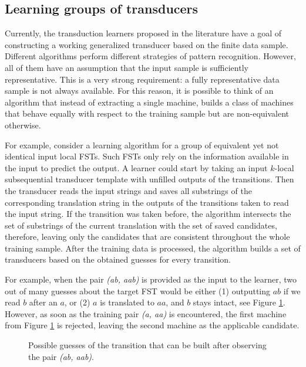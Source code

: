 \subsection{Learning groups of transducers}

Currently, the transduction learners proposed in the literature have a goal of constructing a working generalized transducer based on the finite data sample.
Different algorithms perform different strategies of pattern recognition.
However, all of them have an assumption that the input sample is sufficiently representative.
This is a very strong requirement: a fully representative data sample is not always available.
For this reason, it is possible to think of an algorithm that instead of extracting a single machine, builds a class of machines that behave equally with respect to the training sample but are non-equivalent otherwise.

For example, consider a learning algorithm for a group of equivalent yet not identical input local FSTs.
Such FSTs only rely on the information available in the input to predict the output.
A learner could start by taking an input $k$-local subsequential transducer template with unfilled outputs of the transitions.
Then the transducer reads the input strings and saves all substrings of the corresponding translation string in the outputs of the transitions taken to read the input string.
If the transition was taken before, the algorithm intersects the set of substrings of the current translation with the set of saved candidates, therefore, leaving only the candidates that are consistent throughout the whole training sample.
After the training data is processed, the algorithm builds a set of transducers based on the obtained guesses for every transition.

For example, when the pair \emph{(ab, aab)} is provided as the input to the learner, two out of many guesses about the target FST would be either (1) outputting $ab$ if we read $b$ after an $a$, or (2) $a$ is translated to $aa$, and $b$ stays intact, see Figure \ref{fig:two_opt}.
However, as soon as the training pair \emph{(a, aa)} is encountered, the first machine from Figure \ref{fig:two_opt} is rejected, leaving the second machine as the applicable candidate.

\begin{figure}[h!] 
\centering
{}
\caption{Possible guesses of the transition that can be built after observing the pair \emph{(ab, aab)}.}
\label{fig:two_opt}
\end{figure}


